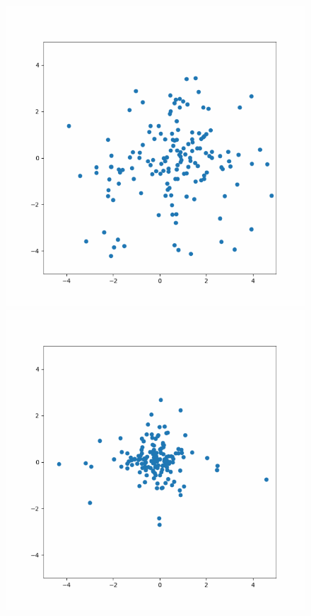 \documentclass[conference]{IEEEtran}
\begin{document}
	\begin{figure}[htbp]
    \begin{center}
    	\includegraphics[scale=0.3]{imagens-pso/particle-swarm-optimization-01.png} 
        \includegraphics[scale=0.3]{imagens-pso/particle-swarm-optimization-02.png}

\end{center}
\end{figure}
\end{document}
